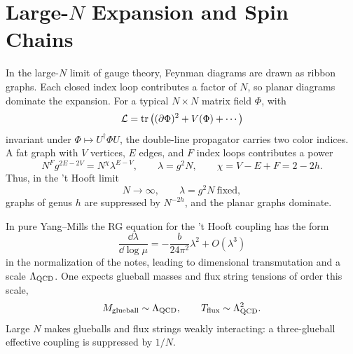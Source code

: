 \section{Large-\texorpdfstring{\(N\)}{N} Expansion and Spin Chains}

In the large-\(N\) limit of gauge theory, Feynman diagrams are drawn as
ribbon graphs.  Each closed index loop contributes a factor of \(N\), so
planar diagrams dominate the expansion.
For a typical \(N\times N\) matrix field \(\Phi\), with
\[
  \mathcal L=\tr\left((\partial\Phi)^2+V(\Phi)+\cdots\right)
\]
invariant under \(\Phi\mapsto U^\dagger\Phi U\), the double-line
propagator carries two color indices.  A fat graph with \(V\) vertices,
\(E\) edges, and \(F\) index loops contributes a power
\[
  N^{F}g^{2E-2V}
  =
  N^{\chi}\lambda^{E-V},
  \qquad
  \lambda=g^2N,
  \qquad
  \chi=V-E+F=2-2h.
\]
Thus, in the 't Hooft limit
\[
  N\to\infty,\qquad \lambda=g^2N\ \text{fixed},
\]
graphs of genus \(h\) are suppressed by \(N^{-2h}\), and the planar
graphs dominate.

In pure Yang--Mills the RG equation for the 't Hooft coupling has the
form
\[
  \frac{\dd\lambda}{\dd\log\mu}
  =
  -\frac{b}{24\pi^2}\lambda^2+O(\lambda^3)
\]
in the normalization of the notes, leading to dimensional transmutation
and a scale \(\Lambda_{\rm QCD}\).  One expects glueball masses and flux
string tensions of order this scale,
\[
  M_{\rm glueball}\sim\Lambda_{\rm QCD},
  \qquad
  T_{\rm flux}\sim\Lambda_{\rm QCD}^2.
\]
Large \(N\) makes glueballs and flux strings weakly interacting: a
three-glueball effective coupling is suppressed by \(1/N\).

